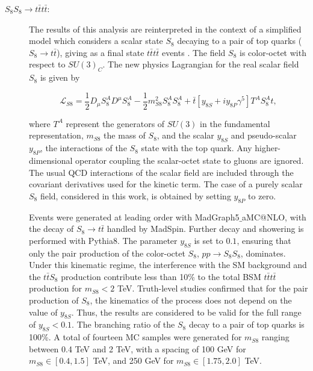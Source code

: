 \begin{description}
\item[$S_8S_8\rightarrow t \bar tt \bar t$:] The results of this analysis  are reinterpreted in the context of a simplified model  which  considers a scalar state $S_8$ decaying to a pair of top quarks  ($S_8 \rightarrow t \bar t$), 
giving as a final state  $t \bar tt \bar t$ events \cite{Darm__2021}.
The field $S_8$ is color-octet with respect to $SU(3)_{C}$.
The new physics Lagrangian for the real scalar field $S_8$ is given by

\begin{equation}
\mathcal{L}_{S8} = \frac{1}{2}D_\mu S_{8}^{A}D^{\mu}S_{8}^{A}- \frac{1}{2} m^2_{S8}S_{8}^{A}S_{8}^{A} + \bar{t} [y_{8S}+i y_{8P}\gamma^{5}]T^{A}S_{8}^{A}t,
\end{equation}

where $T^A$ represent the generators of $SU(3)$ in the fundamental representation, 
$m_{S8}$ the mass of $S_8$, and  the scalar $y_{8S}$ and pseudo-scalar $y_{8P}$,  the interactions of the $S_8$ state with the top quark.  
Any higher-dimensional operator coupling the scalar-octet state to gluons are ignored.  
  The usual QCD interactions of the scalar field are included through the covariant derivatives used for the kinetic term. 
  The case of a purely scalar  $S_8$ field, considered in this work, is obtained by setting $y_{8P}$  to zero.
  
  Events were generated at leading order with MadGraph5$\_$aMC@NLO, with the decay of $S_8\rightarrow t \bar t$ handled by MadSpin. 
  Further decay and showering is  performed with Pythia8.   
  The parameter $y_{8S}$ is set to $0.1$, ensuring that only the pair production of the color-octet $S_8$,  $pp\rightarrow S_8S_8$,  dominates.  
  Under this kinematic regime, the interference with the SM background and the $ t \bar tS_8$ production contribute  less than 10\% to the total BSM $t \bar tt \bar t$ production for  $m_{S8}<2$ TeV.  
  Truth-level studies confirmed that for the pair production  of $S_8$, the kinematics of  the process  does not depend on the value of $y_{8S}$. 
  Thus, the results are considered to be valid for the full range of $y_{8S}<0.1$.  
  The branching ratio of the $S_8$ decay to a pair of top quarks is 100\%.   A total of fourteen MC samples were generated for $m_{S8}$ ranging between 0.4 TeV and 2 TeV, with a spacing of 100 GeV for  $m_{S8}\in [0.4, 1.5]$ TeV, and 250 GeV for $m_{S8}\in [1.75, 2.0]$  TeV.  

\end{description}

